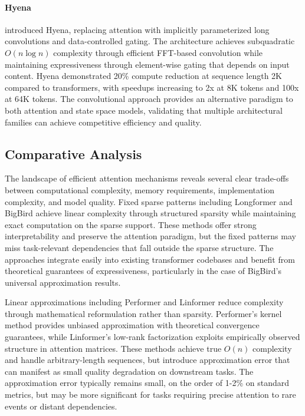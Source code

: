 \paragraph{Hyena}

\citet{poli2023hyena} introduced Hyena, replacing attention with implicitly parameterized long convolutions and data-controlled gating. The architecture achieves subquadratic $O(n \log n)$ complexity through efficient FFT-based convolution while maintaining expressiveness through element-wise gating that depends on input content. Hyena demonstrated 20\% compute reduction at sequence length 2K compared to transformers, with speedups increasing to 2x at 8K tokens and 100x at 64K tokens. The convolutional approach provides an alternative paradigm to both attention and state space models, validating that multiple architectural families can achieve competitive efficiency and quality.

\subsection{Comparative Analysis}

The landscape of efficient attention mechanisms reveals several clear trade-offs between computational complexity, memory requirements, implementation complexity, and model quality. Fixed sparse patterns including Longformer and BigBird achieve linear complexity through structured sparsity while maintaining exact computation on the sparse support. These methods offer strong interpretability and preserve the attention paradigm, but the fixed patterns may miss task-relevant dependencies that fall outside the sparse structure. The approaches integrate easily into existing transformer codebases and benefit from theoretical guarantees of expressiveness, particularly in the case of BigBird's universal approximation results.

Linear approximations including Performer and Linformer reduce complexity through mathematical reformulation rather than sparsity. Performer's kernel method provides unbiased approximation with theoretical convergence guarantees, while Linformer's low-rank factorization exploits empirically observed structure in attention matrices. These methods achieve true $O(n)$ complexity and handle arbitrary-length sequences, but introduce approximation error that can manifest as small quality degradation on downstream tasks. The approximation error typically remains small, on the order of 1-2\% on standard metrics, but may be more significant for tasks requiring precise attention to rare events or distant dependencies.

